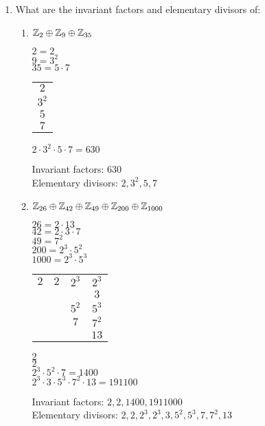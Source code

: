 \documentclass[letterpaper,12pt,fleqn]{article}
\begin{document}
\begin{enumerate}[label={\alph*)}]
\item What are the invariant factors and elementary divisors of:
  \begin{enumerate}[label={\roman*)}]
  \item $\mathbb{Z}_2\oplus\mathbb{Z}_9\oplus\mathbb{Z}_{35}$

    $2=2$ \\
    $9=3^2$ \\
    $35=5\cdot7$

    \begin{tabular}{c}
      $2$ \\
      $3^2$ \\
      $5$ \\
      $7$
    \end{tabular}

    $2\cdot3^2\cdot5\cdot7=630$

    Invariant factors: $630$ \\
    Elementary divisors: $2,3^2,5,7$

  \item $\mathbb{Z}_{26}\oplus\mathbb{Z}_{42}\oplus\mathbb{Z}_{49}\oplus\mathbb{Z}_{200}\oplus\mathbb{Z}_{1000}$

    $26=2\cdot13$ \\
    $42=2\cdot3\cdot7$ \\
    $49=7^2$ \\
    $200=2^3\cdot5^2$ \\
    $1000=2^3\cdot5^3$

    \begin{tabular}{cccc}
      $2$ & $2$ & $2^3$ & $2^3$ \\
      & & & $3$ \\
      & & $5^2$ & $5^3$ \\
      & & $7$ & $7^2$ \\
      & & & $13$ \\
    \end{tabular}

    $2$ \\
    $2$ \\
    $2^3\cdot5^2\cdot7=1400$ \\
    $2^3\cdot3\cdot5^3\cdot7^2\cdot13=191100$

    Invariant factors: $2,2,1400,1911000$ \\
    Elementary divisors: $2,2,2^3,2^3,3,5^2,5^3,7,7^2,13$
  \end{enumerate}


\end{enumerate}
\end{document}
